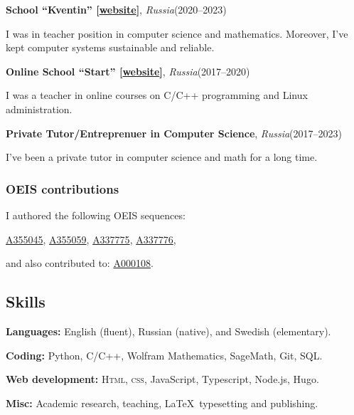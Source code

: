 \documentclass[11pt]{article}
\begin{document}
\vspace{2mm}
\noindent\textbf{School ``Kventin'' [\href{https://kventinptz.ru}{website}]}, \textit{Russia}\hfill(2020--2023)

I was in teacher position in computer science and mathematics. Moreover, I've kept computer systems sustainable and reliable.

\vspace{2mm}
\noindent\textbf{Online School ``Start'' [\href{http://schoolprogstart.tilda.ws}{website}]}, \textit{Russia}\hfill(2017--2020)

I was a teacher in online courses on C/C++ programming and Linux administration. 

\vspace{2mm}
\noindent\textbf{Private Tutor/Entreprenuer in Computer Science}, \textit{Russia}\hfill(2017--2023)

I've been a private tutor in computer science and math for a long time.

\nocite{*}



\printbibliography[heading={subbibliography},title={Journal Articles},type=article]

\printbibliography[heading={subbibliography},title={Conference Proceedings},type=inproceedings]



\subsubsection*{OEIS contributions}
I authored the following OEIS sequences:

\noindent\href{https://oeis.org/A355045}{A355045}, \href{https://oeis.org/A355059}{A355059}, \href{https://oeis.org/A337775}{A337775}, \href{https://oeis.org/A337776}{A337776},

\noindent and also contributed to: \href{https://oeis.org/A000108}{A000108}.


\subsection*{Skills}
\noindent\textbf{Languages:}
	English (fluent), Russian (native), and Swedish (elementary).

\noindent\textbf{Coding:}
	 Python, C/C++, Wolfram Mathematics, SageMath, Git, SQL.

\noindent\textbf{Web development:}
	\textsc{Html, css}, JavaScript, Typescript, Node.js, Hugo.

\noindent\textbf{Misc:}
	Academic research, teaching, \LaTeX\ typesetting and publishing.
\end{document}
